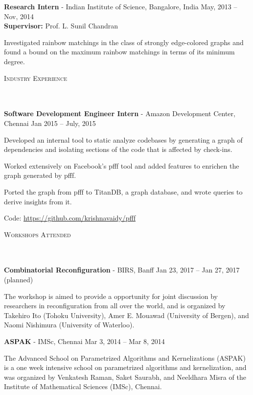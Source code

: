 \documentclass{article}
\newcommand{\header}[1]{{
\hspace*{-15pt}\vspace*{6pt} \textsc{#1}} \vspace*{-6pt} 
\lineunder
}
\newcommand{\lineunder}{
\vspace*{-8pt} \\ \hspace*{-18pt} 
\hrulefill \\
}
\newcommand{\employer}[4]{{
\vspace*{2pt}%
\textbf{#1} - #2 \hfill #3\\ #4 \vspace*{2pt}}
}
\renewcommand{\labelitemii}{
$\vcenter{\hbox{\tiny$\bullet$}}$\hspace*{-3pt}
}
\newenvironment{bullet-list-minor}{
\begin{list}{\labelitemii}{\setlength\leftmargin{15pt} 
\topsep 0pt \itemsep -2pt}}{\vspace*{4pt}\end{list}
}
\begin{document}
\employer{Research Intern}{Indian Institute of Science, Bangalore, India}{May,
    2013 -- Nov, 2014}{\textbf{Supervisor:} Prof. L. Sunil Chandran}
\begin{bullet-list-minor}
\item Investigated rainbow matchings in the class of strongly edge-colored graphs and found a bound on the maximum rainbow matchings in terms of its minimum degree.
\end{bullet-list-minor}

\vspace*{4pt}%
\header{Industry Experience}
    \employer{Software Development Engineer Intern}{Amazon Development Center,
        Chennai}{Jan 2015 -- July,
        2015}{}
	\begin{bullet-list-minor}
        \item Developed an internal tool to static analyze codebases by
            generating a graph of dependencies and isolating sections of the code
            that is affected by check-ins. 
        \item Worked extensively on Facebook's pfff tool and
            added features to enrichen the graph generated by pfff.
        \item Ported the graph from pfff to TitanDB, a graph
            database, and wrote queries to derive insights from it.
        \item Code: \url{https://github.com/krishnavaidy/pfff}
    \end{bullet-list-minor}

\vspace*{4pt}
\header{Workshops Attended}
\employer{Combinatorial Reconfiguration}{BIRS,
    Banff}{Jan 23, 2017 -- Jan 27, 2017 (planned)}{}
\begin{bullet-list-minor}
\item The workshop is aimed to provide a
    opportunity for joint discussion by researchers in reconfiguration from all
    over the world, and is organized by Takehiro Ito (Tohoku University), Amer E. Mouawad (University of Bergen),
    and Naomi Nishimura (University of Waterloo). 
\end{bullet-list-minor}

\employer{ASPAK}{IMSc, Chennai}{Mar 3, 2014 -- Mar 8, 2014}{}
\begin{bullet-list-minor}
\item The Advanced School on Parametrized Algorithms and Kernelizations (ASPAK)
    is a one week intensive school on parametrized algorithms and kernelization,
    and was organized by Venkatesh Raman, Saket Saurabh, and Neeldhara Misra of
    the Institute of Mathematical Sciences (IMSc), Chennai.
\end{bullet-list-minor}
\end{document}
